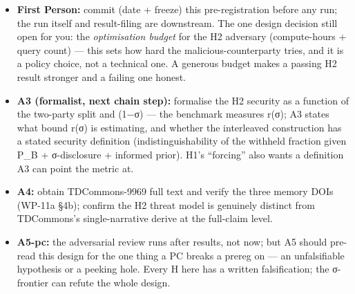 \documentclass[
  11pt,
]{article}
\providecommand{\tightlist}{%
  \setlength{\itemsep}{0pt}\setlength{\parskip}{0pt}}
\begin{document}
\begin{itemize}
\tightlist
\item
  \textbf{First Person:} commit (date + freeze) this pre-registration
  before any run; the run itself and result-filing are downstream. The
  one design decision still open for you: the \emph{optimisation budget}
  for the H2 adversary (compute-hours + query count) --- this sets how
  hard the malicious-counterparty tries, and it is a policy choice, not
  a technical one. A generous budget makes a passing H2 result stronger
  and a failing one honest.
\item
  \textbf{A3 (formalist, next chain step):} formalise the H2 security as
  a function of the two-party split and (1−σ) --- the benchmark measures
  r(σ); A3 states what bound r(σ) is estimating, and whether the
  interleaved construction has a stated security definition
  (indistinguishability of the withheld fraction given P\_B +
  σ-disclosure + informed prior). H1's ``forcing'' also wants a
  definition A3 can point the metric at.
\item
  \textbf{A4:} obtain TDCommons-9969 full text and verify the three
  memory DOIs (WP-11a §4b); confirm the H2 threat model is genuinely
  distinct from TDCommons's single-narrative derive at the full-claim
  level.
\item
  \textbf{A5-pc:} the adversarial review runs after results, not now;
  but A5 should pre-read this design for the one thing a PC breaks a
  prereg on --- an unfalsifiable hypothesis or a peeking hole. Every H
  here has a written falsification; the σ-frontier can refute the whole
  design.
\end{itemize}
\end{document}
